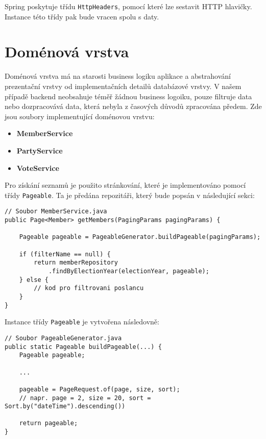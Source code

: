 \noindent Spring poskytuje třídu \lstinline|HttpHeaders|, pomocí které lze sestavit HTTP hlavičky. Instance této třídy pak bude vracen spolu s daty.

\section {Doménová vrstva}
Doménová vrstva má na starosti business logiku aplikace a abstrahování prezentační vrstvy od implementačních detailů databázové vrstvy. V našem případě backend neobsahuje téměř žádnou business logoiku, pouze filtruje data nebo dozpracovává data, která nebyla z časových důvodů zpracována předem. Zde jsou soubory implementující doménovou vrstvu:

\begin{itemize}
	\item \textbf{MemberService}
	\item \textbf{PartyService}
	\item \textbf{VoteService}
\end{itemize}

\noindent Pro získání seznamů je použito stránkování, které je implementováno pomocí třídy \lstinline|Pageable|. Ta je předána repozitáři, který bude popsán v následující sekci:

\begin{lstlisting}[caption={Ukázka doménové vrstvy pro vrácení seznamu poslanců}, label={lst:headers-paging}, tabsize=2]
// Soubor MemberService.java
public Page<Member> getMembers(PagingParams pagingParams) {
	
	Pageable pageable = PageableGenerator.buildPageable(pagingParams);
	
	if (filterName == null) {
		return memberRepository
			.findByElectionYear(electionYear, pageable);
	} else {
		// kod pro filtrovani poslancu
	}
}
\end{lstlisting}

\noindent Instance třídy \lstinline|Pageable| je vytvořena následovně:

\begin{lstlisting}[caption={Ukázka kódu pro sestavení objektu pro stránkování}, label={lst:paging-object}, tabsize=2]
// Soubor PageableGenerator.java
public static Pageable buildPageable(...) {
	Pageable pageable;
	
	...
	
	pageable = PageRequest.of(page, size, sort);
	// napr. page = 2, size = 20, sort = Sort.by("dateTime").descending())
	
	return pageable;
}

\end{lstlisting}

